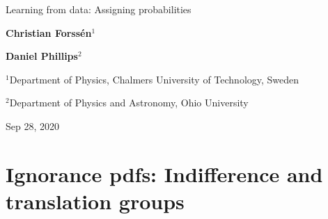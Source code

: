 \documentclass[%
oneside,                 %
final,                   %
10pt]{article}
\begin{document}

\newcommand{\exercisesection}[1]{\subsection*{#1}}







\thispagestyle{empty}

\begin{center}
{\LARGE\bf
\begin{spacing}{1.25}
Learning from data: Assigning probabilities
\end{spacing}
}
\end{center}


\begin{center}
{\bf Christian Forssén${}^{1}$} \\ [0mm]
\end{center}


\begin{center}
{\bf Daniel Phillips${}^{2}$} \\ [0mm]
\end{center}

\begin{center}
\centerline{{\small ${}^1$Department of Physics, Chalmers University of Technology, Sweden}}
\centerline{{\small ${}^2$Department of Physics and Astronomy, Ohio University}}
\end{center}
    

\begin{center}
Sep 28, 2020
\end{center}

\vspace{1cm}


\section{Ignorance pdfs: Indifference and translation groups}
\end{document}
